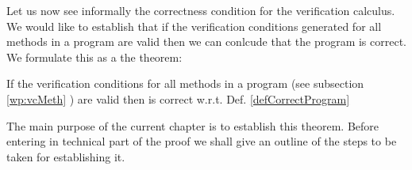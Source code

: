 Let us now see informally the correctness condition for the verification calculus. 
We would like to establish that if the verification conditions
generated for all methods in a program are valid then we can conlcude that the program is correct. 
We formulate this as a the theorem:
\begin{vcGenCorrect}\label{vcGenCorrect}

If the verification conditions  for all  methods in a program \Program{}  (see  subsection \ref{wp:vcMeth} )
are valid then \Program{} is correct w.r.t. Def. \ref{defCorrectProgram}
%        

\end{vcGenCorrect}

The main purpose of the current chapter is to establish this theorem. Before entering in technical part of the proof
we shall give an outline of the steps to be taken for establishing it.


